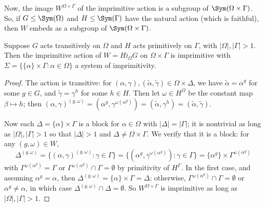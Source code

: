 Now, the image $W^{\Omega \times \Gamma}$ of the imprimitive action is a subgroup of $\Sym(\Omega \times \Gamma)$. So, if $G \leq \Sym(\Omega)$ and $H \leq \Sym(\Gamma)$ have the natural action (which is faithful), then $W$ embeds as a subgroup of $\Sym(\Omega \times \Gamma)$.

\begin{lemma}\label{lem:imprimitive_action_is_imprimitive}
    Suppose $G$ acts transitively on $\Omega$ and $H$ acts primitively on $\Gamma$, with $|\Omega|,|\Gamma| > 1$. Then the imprimitive action of $W = H \wr_\Omega G$ on $\Omega \times \Gamma$ is imprimitive with $\Sigma = \{\{\alpha\} \times \Gamma : \alpha \in \Omega\}$ a system of imprimitivity.
\end{lemma}

\begin{proof}
    The action is transitive: for $(\alpha,\gamma),(\tilde\alpha,\tilde\gamma) \in \Omega \times \Delta$, we have $\tilde\alpha = \alpha^g$ for some $g \in G$, and $\tilde\gamma = \gamma^h$ for some $h \in H$. Then let $\omega \in H^\Omega$ be the constant map $\beta \mapsto h$; then $(\alpha,\gamma)^{(g,\omega)} = (\alpha^g,\gamma^{\omega(\alpha^g)}) = (\tilde\alpha,\gamma^h) = (\tilde\alpha,\tilde\gamma)$.

    Now each $\Delta = \{\alpha\} \times \Gamma$ is a block for $\alpha \in \Omega$ with $|\Delta| = |\Gamma|$; it is nontrivial as long as $|\Omega|,|\Gamma| > 1$ so that $|\Delta| > 1$ and $\Delta \neq \Omega \times \Gamma$. We verify that it is a block: for any $(g,\omega) \in W$,
    $$\Delta^{(g,\omega)} = \{(\alpha,\gamma)^{(g,\omega)} : \gamma \in \Gamma\} = \{(\alpha^g,\gamma^{\omega(\alpha^g)}) : \gamma \in \Gamma\} = \{\alpha^g\} \times \Gamma^{\omega(\alpha^g)}$$
    with $\Gamma^{\omega(\alpha^g)} = \Gamma$ or $\Gamma^{\omega(\alpha^g)} \cap \Gamma = \emptyset$ by primitivity of $H^\Gamma$. In the first case, and assuming $\alpha^g = \alpha$, then $\Delta^{(g,\omega)} = \{\alpha\} \times \Gamma = \Delta$; otherwise, $\Gamma^{\omega(\alpha^g)} \cap \Gamma = \emptyset$ or $\alpha^g \neq \alpha$, in which case $\Delta^{(g,\omega)} \cap \Delta = \emptyset$. So $W^{\Omega \times \Gamma}$ is imprimitive as long as $|\Omega|,|\Gamma| > 1$.
\end{proof}


